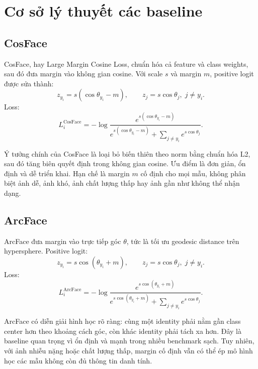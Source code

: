\documentclass[13pt,a4paper]{extreport}
\begin{document}
\chapter{Cơ sở lý thuyết các baseline}

\section{CosFace}
CosFace, hay Large Margin Cosine Loss, chuẩn hóa cả feature và class weights, sau đó đưa margin vào không gian cosine. Với scale $s$ và margin $m$, positive logit được sửa thành:
\begin{equation}
    z_{y_i}=s(\cos\theta_{y_i}-m), \qquad z_j=s\cos\theta_j,\; j\ne y_i.
\end{equation}
Loss:
\begin{equation}
    L_i^{\text{CosFace}}=-\log \frac{e^{s(\cos\theta_{y_i}-m)}}{e^{s(\cos\theta_{y_i}-m)}+\sum_{j\ne y_i} e^{s\cos\theta_j}}.
\end{equation}

Ý tưởng chính của CosFace là loại bỏ biến thiên theo norm bằng chuẩn hóa L2, sau đó tăng biên quyết định trong không gian cosine. Ưu điểm là đơn giản, ổn định và dễ triển khai. Hạn chế là margin $m$ cố định cho mọi mẫu, không phân biệt ảnh dễ, ảnh khó, ảnh chất lượng thấp hay ảnh gần như không thể nhận dạng.

\section{ArcFace}
ArcFace đưa margin vào trực tiếp góc $\theta$, tức là tối ưu geodesic distance trên hypersphere. Positive logit:
\begin{equation}
    z_{y_i}=s\cos(\theta_{y_i}+m), \qquad z_j=s\cos\theta_j,\; j\ne y_i.
\end{equation}
Loss:
\begin{equation}
    L_i^{\text{ArcFace}}=-\log \frac{e^{s\cos(\theta_{y_i}+m)}}{e^{s\cos(\theta_{y_i}+m)}+\sum_{j\ne y_i}e^{s\cos\theta_j}}.
\end{equation}

ArcFace có diễn giải hình học rõ ràng: cùng một identity phải nằm gần class center hơn theo khoảng cách góc, còn khác identity phải tách xa hơn. Đây là baseline quan trọng vì ổn định và mạnh trong nhiều benchmark sạch. Tuy nhiên, với ảnh nhiễu nặng hoặc chất lượng thấp, margin cố định vẫn có thể ép mô hình học các mẫu không còn đủ thông tin danh tính.
\end{document}
